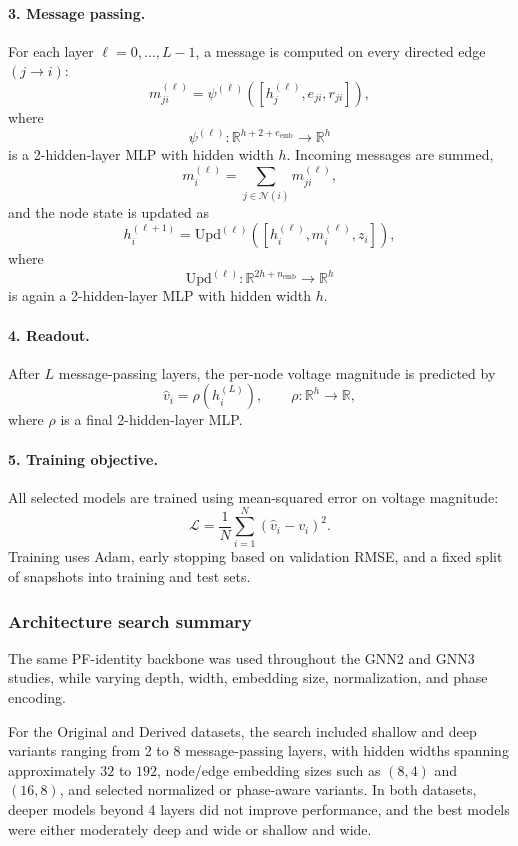 \documentclass[11pt]{article}
\begin{document}
\paragraph{3. Message passing.}
For each layer $\ell = 0,\dots,L-1$, a message is computed on every directed edge $(j \to i)$:
\[
m_{ji}^{(\ell)} =
\psi^{(\ell)}\!\left([h_j^{(\ell)}, e_{ji}, r_{ji}]\right),
\]
where
\[
\psi^{(\ell)} : \mathbb{R}^{h+2+e_{\text{emb}}} \to \mathbb{R}^{h}
\]
is a 2-hidden-layer MLP with hidden width $h$. Incoming messages are summed,
\[
m_i^{(\ell)} = \sum_{j \in \mathcal{N}(i)} m_{ji}^{(\ell)},
\]
and the node state is updated as
\[
h_i^{(\ell+1)} =
\mathrm{Upd}^{(\ell)}\!\left([h_i^{(\ell)}, m_i^{(\ell)}, z_i]\right),
\]
where
\[
\mathrm{Upd}^{(\ell)} : \mathbb{R}^{2h+n_{\text{emb}}} \to \mathbb{R}^{h}
\]
is again a 2-hidden-layer MLP with hidden width $h$.

\paragraph{4. Readout.}
After $L$ message-passing layers, the per-node voltage magnitude is predicted by
\[
\hat v_i = \rho(h_i^{(L)}),
\qquad
\rho : \mathbb{R}^{h} \to \mathbb{R},
\]
where $\rho$ is a final 2-hidden-layer MLP.

\paragraph{5. Training objective.}
All selected models are trained using mean-squared error on voltage magnitude:
\[
\mathcal{L} = \frac{1}{N}\sum_{i=1}^{N}(\hat v_i - v_i)^2.
\]
Training uses Adam, early stopping based on validation RMSE, and a fixed split of snapshots into training and test sets.

\subsubsection*{Architecture search summary}

The same PF-identity backbone was used throughout the GNN2 and GNN3 studies, while varying depth, width, embedding size, normalization, and phase encoding.

For the Original and Derived datasets, the search included shallow and deep variants ranging from 2 to 8 message-passing layers, with hidden widths spanning approximately $32$ to $192$, node/edge embedding sizes such as $(8,4)$ and $(16,8)$, and selected normalized or phase-aware variants. In both datasets, deeper models beyond 4 layers did not improve performance, and the best models were either moderately deep and wide or shallow and wide.
\end{document}
